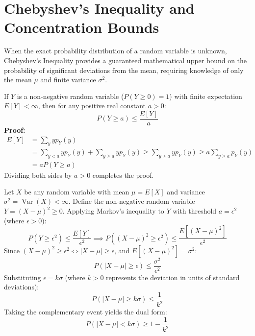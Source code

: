 \documentclass[12pt,a4paper]{article}
\begin{document}
\section{Chebyshev's Inequality and Concentration Bounds}

When the exact probability distribution of a random variable is unknown, Chebyshev's Inequality provides a guaranteed mathematical upper bound on the probability of significant deviations from the mean, requiring knowledge of only the mean $\mu$ and finite variance $\sigma^2$.

\begin{tcolorbox}[defbox, title={\textbf{Markov's Inequality (Foundation for Chebyshev)}}]
If $Y$ is a non-negative random variable ($P(Y \ge 0) = 1$) with finite expectation $E[Y] < \infty$, then for any positive real constant $a > 0$:
\begin{equation}
  P(Y \ge a) \le \frac{E[Y]}{a}
\end{equation}
\textbf{Proof:}
\begin{equation}
  \begin{aligned}
    E[Y] &= \sum_{y} y p_Y(y) \\[3pt]
    &= \sum_{y < a} y p_Y(y) + \sum_{y \ge a} y p_Y(y) \ge \sum_{y \ge a} y p_Y(y) \ge a \sum_{y \ge a} p_Y(y) \\[3pt]
    &= a P(Y \ge a)
  \end{aligned}
\end{equation}
Dividing both sides by $a > 0$ completes the proof.
\end{tcolorbox}

\begin{tcolorbox}[examplebox, title={\textbf{Rigorous Derivation of Chebyshev's Inequality}}]
Let $X$ be any random variable with mean $\mu = E[X]$ and variance $\sigma^2 = \operatorname{Var}(X) < \infty$.
Define the non-negative random variable $Y = (X - \mu)^2 \ge 0$.
Applying Markov's inequality to $Y$ with threshold $a = \epsilon^2$ (where $\epsilon > 0$):
\begin{equation}
  P\left(Y \ge \epsilon^2\right) \le \frac{E[Y]}{\epsilon^2} \implies P\left((X - \mu)^2 \ge \epsilon^2\right) \le \frac{E\left[(X - \mu)^2\right]}{\epsilon^2}
\end{equation}
Since $(X - \mu)^2 \ge \epsilon^2 \iff |X - \mu| \ge \epsilon$, and $E[(X - \mu)^2] = \sigma^2$:
\begin{equation}
  P(|X - \mu| \ge \epsilon) \le \frac{\sigma^2}{\epsilon^2}
\end{equation}
Substituting $\epsilon = k\sigma$ (where $k > 0$ represents the deviation in units of standard deviations):
\begin{equation}
  P(|X - \mu| \ge k\sigma) \le \frac{1}{k^2}
\end{equation}
Taking the complementary event yields the dual form:
\begin{equation}
  P(|X - \mu| < k\sigma) \ge 1 - \frac{1}{k^2}
\end{equation}
\end{tcolorbox}
\end{document}
